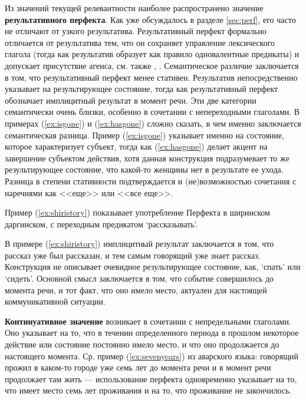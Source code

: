 Из значений текущей релевантности наиболее распространено значение \textbf{результативного перфекта}. Как уже обсуждалось в разделе \ref{sec:perf}, его часто не отличают от узкого результатива. Результативный перфект формально отличается от результатива тем, что он сохраняет управление лексического глагола (тогда как результатив образует как правило одновалентные предикаты) и допускает присутствие агенса, см. также \citep[10]{plungian2016}, \citep[263]{verhees2018}. Семантическое различие заключается в том, что результативный перфект менее стативен. Результатив непосредственно указывает на результирующее состояние, тогда как результативный перфект обозначает имплицитный результат в момент речи. Эти две категории семантически очень близки, особенно в сочетании с непереходными глаголами. В примерах (\ref{ex:isgone}) и (\ref{ex:hasgone}) сложно сказать, в чем именно заключается семантическая разница. Пример (\ref{ex:isgone}) указывает именно на состояние, которое характеризует субъект, тогда как (\ref{ex:hasgone}) делает акцент на завершение субъектом действия, хотя данная конструкция подразумевает то же результирующее состояние, что какой-то женщины нет в результате ее ухода. Разница в степени стативности подтверждается и (не)возможностью сочетания с наречиями как <<еще>> или <<все еще>>. 
\par Пример (\ref{ex:shiristory}) показывает употребление Перфекта в ширинском даргинском, с переходным предикатом `рассказывать'.


В примере (\ref{ex:shiristory}) имплицитный результат заключается в том, что рассказ уже был рассказан, и тем самым говорящий уже знает рассказ. Конструкция не описывает очевидное результирующее состояние, как, `спать' или `сидеть'. Основной смысл заключается в том, что событие совершилось до момента речи, и тот факт, что оно имело место, актуален для настоящей коммуникативной ситуации.
\par \textbf{Континуативное значение} возникает в сочетании с непредельными глаголами. Оно указывает на то, что в течении определенного периода в прошлом некоторое действие или состояние постоянно имело место, и что оно продолжается до настоящего момента. Ср. пример (\ref{ex:sevenyears}) из аварского языка: говорящий прожил в каком-то городе уже семь лет до момента речи и в момент речи продолжает там жить --- использование перфекта одновременно указывает на то, что имеет место семь лет проживания и на то, что проживание не закончилось.

